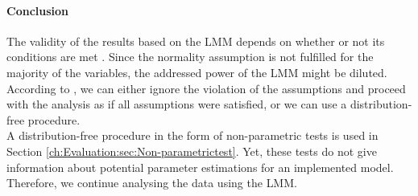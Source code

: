 \paragraph{Conclusion}
The validity of the results based on the \ac{LMM} depends on whether or not its conditions are met \citep{Siegel1957}. Since the normality assumption is not fulfilled for the majority of the variables, the addressed power of the \ac{LMM} might be diluted. \\
According to \cite{Graybill1976}, we can either ignore the violation of the assumptions and proceed with the analysis as if all assumptions were satisfied, or we can use a distribution-free procedure. \\
A distribution-free procedure in the form of non-parametric tests is used in Section \ref{ch:Evaluation:sec:Non-parametrictest}. Yet, these tests do not give information about potential parameter estimations for an implemented model.
Therefore, we continue analysing the data using the \ac{LMM}.

